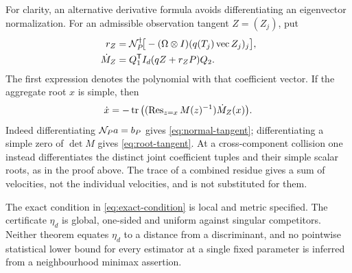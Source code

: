 For clarity, an alternative derivative formula avoids differentiating
an eigenvector normalization. For an admissible observation tangent
$Z=(Z_j)$, put
\begin{align}
 r_Z&=\mathcal N_P^{\dagger}\!\big[-(\Omega\otimes I)
                         (q(T_j)\operatorname{vec}Z_j)_j\big],
                                                        \label{eq:normal-tangent}\\
 \dot M_Z&=Q_1^{\mathsf T}I_d(qZ+r_ZP)Q_2.\nonumber
\end{align}
The first expression denotes the polynomial with that coefficient
vector. If the aggregate root $x$ is simple, then
\begin{equation}\label{eq:root-tangent}
 \dot x=-\operatorname{tr}\big((\operatorname{Res}_{z=x}M(z)^{-1})\dot M_Z(x)\big).
\end{equation}
Indeed differentiating $\mathcal N_Pa=b_P$ gives
\eqref{eq:normal-tangent}; differentiating a simple zero of
$\det M$ gives \eqref{eq:root-tangent}. At a cross-component collision
one instead differentiates the distinct joint coefficient tuples and
their simple scalar roots, as in the proof above. The trace of a
combined residue gives a sum of velocities, not the individual
velocities, and is not substituted for them.

The exact condition in \eqref{eq:exact-condition} is local and metric
specified. The certificate $\eta_d$ is global, one-sided and uniform
against singular competitors. Neither theorem equates $\eta_d$ to a
distance from a discriminant, and no pointwise statistical lower bound
for every estimator at a single fixed parameter is inferred from a
neighbourhood minimax assertion.
